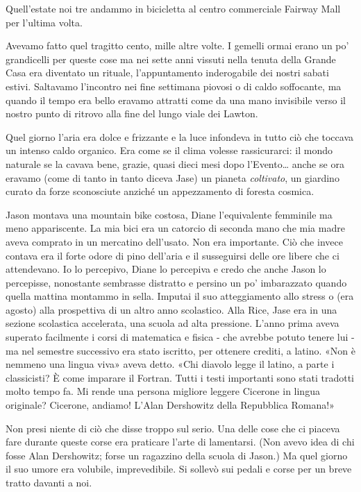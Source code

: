 \separatorefiori

Quell'estate noi tre andammo in bicicletta al centro commerciale Fairway
Mall per l'ultima volta.

Avevamo fatto quel tragitto cento, mille altre volte. I gemelli ormai
erano un po' grandicelli per queste cose ma nei sette anni vissuti nella
tenuta della Grande Casa era diventato un rituale, l'appuntamento
inderogabile dei nostri sabati estivi. Saltavamo l'incontro nei fine
settimana piovosi o di caldo soffocante, ma quando il tempo era bello
eravamo attratti come da una mano invisibile verso il nostro punto di
ritrovo alla fine del lungo viale dei Lawton.

Quel giorno l'aria era dolce e frizzante e la luce infondeva in tutto
ciò che toccava un intenso caldo organico. Era come se il clima volesse
rassicurarci: il mondo naturale se la cavava bene, grazie, quasi dieci
mesi dopo l'Evento\ldots{} anche se ora eravamo (come di tanto in tanto
diceva Jase) un pianeta \emph{coltivato}, un giardino curato da forze
sconosciute anziché un appezzamento di foresta cosmica.

Jason montava una mountain bike costosa, Diane l'equivalente femminile
ma meno appariscente. La mia bici era un catorcio di seconda mano che
mia madre aveva comprato in un mercatino dell'usato. Non era importante.
Ciò che invece contava era il forte odore di pino dell'aria e il
susseguirsi delle ore libere che ci attendevano. Io lo percepivo, Diane
lo percepiva e credo che anche Jason lo percepisse, nonostante sembrasse
distratto e persino un po' imbarazzato quando quella mattina montammo in
sella. Imputai il suo atteggiamento allo stress o (era agosto) alla
prospettiva di un altro anno scolastico. Alla Rice, Jase era in una
sezione scolastica accelerata, una scuola ad alta pressione. L'anno
prima aveva superato facilmente i corsi di matematica e fisica - che
avrebbe potuto tenere lui - ma nel semestre successivo era stato
iscritto, per ottenere crediti, a latino. «Non è nemmeno una lingua
viva» aveva detto. «Chi diavolo legge il latino, a parte i classicisti?
È come imparare il Fortran. Tutti i testi importanti sono stati tradotti
molto tempo fa. Mi rende una persona migliore leggere Cicerone in lingua
originale? Cicerone, andiamo! L'Alan Dershowitz della Repubblica
Romana!»

Non presi niente di ciò che disse troppo sul serio. Una delle cose che
ci piaceva fare durante queste corse era praticare l'arte di lamentarsi.
(Non avevo idea di chi fosse Alan Dershowitz; forse un ragazzino della
scuola di Jason.) Ma quel giorno il suo umore era volubile,
imprevedibile. Si sollevò sui pedali e corse per un breve tratto davanti
a noi.

